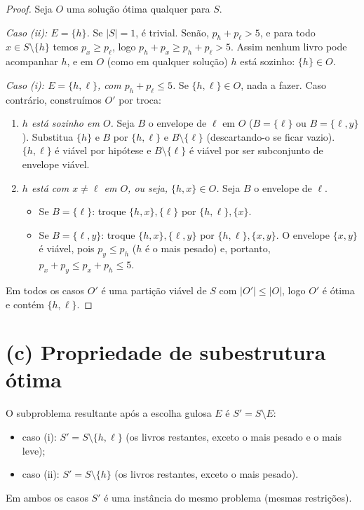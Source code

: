 \documentclass[11pt,a4paper]{article}
\begin{document}
\begin{proof}
Seja $O$ uma solução ótima qualquer para $S$.

\smallskip\noindent\emph{Caso (ii): $E = \{h\}$.} Se $|S|=1$, é trivial. Senão,
$p_h + p_\ell > 5$, e para todo $x \in S\setminus\{h\}$ temos $p_x \ge p_\ell$, logo
$p_h + p_x \ge p_h + p_\ell > 5$. Assim nenhum livro pode acompanhar $h$, e em
$O$ (como em qualquer solução) $h$ está sozinho: $\{h\} \in O$.

\smallskip\noindent\emph{Caso (i): $E = \{h,\ell\}$, com $p_h+p_\ell \le 5$.}
Se $\{h,\ell\}\in O$, nada a fazer. Caso contrário, construímos $O'$ por troca:
\begin{enumerate}
  \item \emph{$h$ está sozinho em $O$.} Seja $B$ o envelope de $\ell$ em $O$
    ($B=\{\ell\}$ ou $B=\{\ell,y\}$). Substitua $\{h\}$ e $B$ por $\{h,\ell\}$ e
    $B\setminus\{\ell\}$ (descartando-o se ficar vazio). $\{h,\ell\}$ é viável por
    hipótese e $B\setminus\{\ell\}$ é viável por ser subconjunto de envelope viável.
  \item \emph{$h$ está com $x \ne \ell$ em $O$, ou seja, $\{h,x\} \in O$.}
    Seja $B$ o envelope de $\ell$.
    \begin{itemize}
      \item Se $B=\{\ell\}$: troque $\{h,x\},\{\ell\}$ por $\{h,\ell\},\{x\}$.
      \item Se $B=\{\ell,y\}$: troque $\{h,x\},\{\ell,y\}$ por $\{h,\ell\},\{x,y\}$.
        O envelope $\{x,y\}$ é viável, pois $p_y \le p_h$ ($h$ é o mais pesado) e,
        portanto, $p_x + p_y \le p_x + p_h \le 5$.
    \end{itemize}
\end{enumerate}
Em todos os casos $O'$ é uma partição viável de $S$ com $|O'| \le |O|$, logo
$O'$ é ótima e contém $\{h,\ell\}$.
\end{proof}

\section*{(c) Propriedade de subestrutura ótima}

O subproblema resultante após a escolha gulosa $E$ é $S' = S \setminus E$:
\begin{itemize}
  \item caso (i): $S' = S \setminus \{h,\ell\}$ (os livros restantes, exceto o mais pesado e o mais leve);
  \item caso (ii): $S' = S \setminus \{h\}$ (os livros restantes, exceto o mais pesado).
\end{itemize}
Em ambos os casos $S'$ é uma instância do mesmo problema (mesmas restrições).
\end{document}
